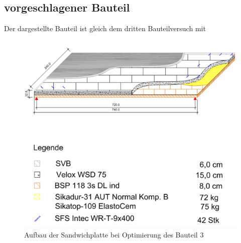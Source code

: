 \newpage
\subsection{vorgeschlagener Bauteil}
Der dargestellte Bauteil ist gleich dem dritten Bauteilversuch mit 
\begin{figure}[h!]
\begin{center}
\includegraphics[scale =0.8]{Wirtschaftlichkeitsvergleich/Varianten/var_opti.jpg}
\caption{Aufbau der Sandwichplatte bei Optimierung des Bauteil 3}
\end{center}
\end{figure}


